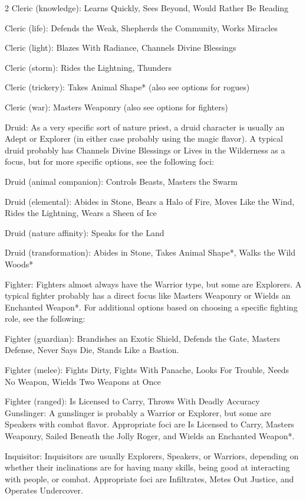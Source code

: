 \begin{multicols}{2}
Cleric (knowledge): Learns Quickly, Sees Beyond, Would Rather Be Reading 

Cleric (life): Defends the Weak, Shepherds the Community, Works Miracles

Cleric (light): Blazes With Radiance, Channels Divine Blessings 

Cleric (storm): Rides the Lightning, Thunders 

Cleric (trickery): Takes Animal Shape* (also see options for rogues)

Cleric (war): Masters Weaponry (also see options for fighters)

Druid: As a very specific sort of nature priest, a druid character is usually an Adept or Explorer (in either case probably using the magic flavor). A typical druid probably has Channels Divine Blessings or Lives in the Wilderness as a focus, but for more specific options, see the following foci: 

Druid (animal companion): Controls Beasts, Masters the Swarm 

Druid (elemental): Abides in Stone, Bears a Halo of Fire, Moves Like the Wind, Rides the Lightning, Wears a Sheen of Ice 

Druid (nature affinity): Speaks for the Land 

Druid (transformation): Abides in Stone, Takes Animal Shape*, Walks the Wild Woods*

Fighter: Fighters almost always have the Warrior type, but some are Explorers. A typical fighter probably has a direct focus like Masters Weaponry or Wields an Enchanted Weapon*. For additional options based on choosing a specific fighting role, see the following: 

Fighter (guardian): Brandishes an Exotic Shield, Defends the Gate, Masters Defense, Never Says Die, Stands Like a Bastion. 

Fighter (melee): Fights Dirty, Fights With Panache, Looks For Trouble, Needs No Weapon, Wields Two Weapons at Once 

Fighter (ranged): Is Licensed to Carry, Throws With Deadly Accuracy
Gunslinger: A gunslinger is probably a Warrior or Explorer, but some are Speakers with combat flavor. Appropriate foci are Is Licensed to Carry, Masters Weaponry, 
Sailed Beneath the Jolly Roger, and Wields an Enchanted Weapon*. 

Inquisitor: Inquisitors are usually Explorers, Speakers, or Warriors, depending on whether their inclinations are for having many skills, being good at interacting with people, or combat. Appropriate foci are Infiltrates, Metes Out Justice, and Operates Undercover. 


\end{multicols}
